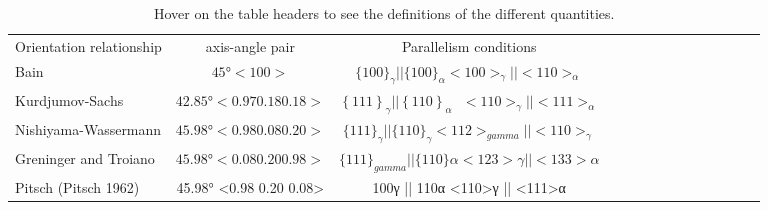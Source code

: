 
\begin{table*}
\caption{Hover on the table headers to see the definitions of the  different quantities.}
\label{table}
\begin{tabular}{l c | c c c c c c  c c c c c c}
\hline\hline
    Orientation relationship & axis-angle pair & Parallelism conditions \\
    Bain \cite{bain1924nature} & \(45°<100>\) & $\{100\}_{\gamma} || \{100\}_{\alpha} <100>_{\gamma } || <110>_{\alpha}$ \\
    Kurdjumov-Sachs \cite{kurdjumow1930mechanismus} & \(42.85°<0.970.180.18>\) & $\left\{111\right\}_{\gamma}||\left\{110\right\}_{\alpha}\ \ \ <110>_{\gamma}||<111>_{\alpha}$ \\
    Nishiyama-Wassermann\cite{nishiyama1934x,wassermann1935ueber} & $45.98° <0.98 0.08 0.20>$ & $\{111\}_{\gamma} || \{110\}_{\gamma} <112>_{gamma} || <110>_{\gamma}$ \\
    Greninger and Troiano\cite{greninger1949mechanism} & $45.98° <0.08 0.20 0.98>$ & $\{111\}_{gamma} || \{110\}α <123>γ || <133>α$ \\
    Pitsch (Pitsch 1962) & 45.98° <0.98 0.20 0.08> & {100}γ || {110}α <110>γ || <111>α \\
\hline
\end{tabular}
\end{table*}
